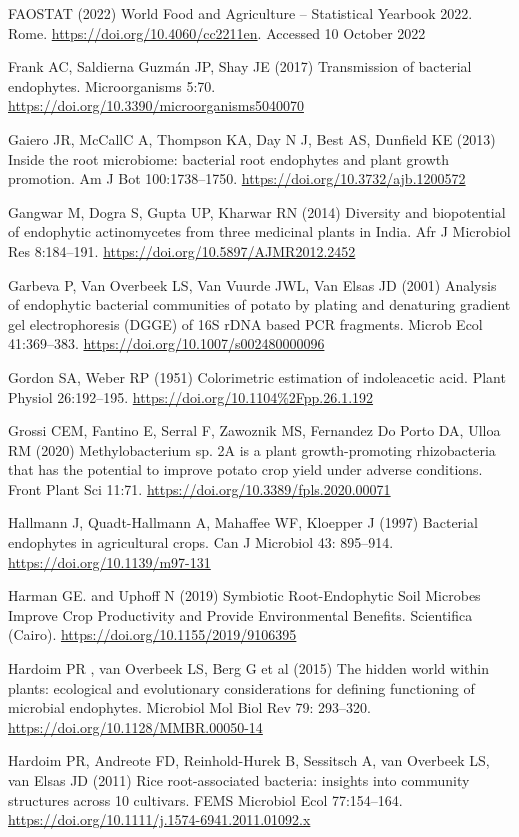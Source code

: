 \documentclass[sn-mathphys,Numbered]{sn-jnl}%
\theoremstyle{thmstyleone}%
\theoremstyle{thmstyletwo}%
\theoremstyle{thmstylethree}%
\begin{document}
FAOSTAT (2022) World Food and Agriculture – Statistical Yearbook 2022. Rome. \url{https://doi.org/10.4060/cc2211en}. Accessed 10 October 2022

Frank AC, Saldierna Guzmán JP, Shay JE (2017) Transmission of bacterial endophytes. Microorganisms 5:70. \url{https://doi.org/10.3390/microorganisms5040070}

Gaiero JR, McCallC A, Thompson KA, Day N J, Best AS, Dunfield KE (2013) Inside the root microbiome: bacterial root endophytes and plant growth promotion. Am J Bot 100:1738–1750. \url{https://doi.org/10.3732/ajb.1200572}

Gangwar M, Dogra S, Gupta UP, Kharwar RN (2014)   Diversity and biopotential of endophytic actinomycetes from three medicinal plants in India. Afr J Microbiol Res 8:184–191. \url{https://doi.org/10.5897/AJMR2012.2452}

Garbeva P, Van Overbeek LS, Van Vuurde JWL, Van Elsas JD (2001) Analysis of endophytic bacterial communities of potato by plating and denaturing gradient gel electrophoresis (DGGE) of 16S rDNA based PCR fragments. Microb Ecol 41:369–383. \url{https://doi.org/10.1007/s002480000096}

Gordon SA, Weber RP (1951) Colorimetric estimation of indoleacetic acid. Plant Physiol 26:192–195. \url{https://doi.org/10.1104%2Fpp.26.1.192}

Grossi CEM, Fantino E, Serral F, Zawoznik MS, Fernandez Do Porto DA, Ulloa RM (2020) Methylobacterium sp. 2A is a plant growth-promoting rhizobacteria that has the potential to improve potato crop yield under adverse conditions. Front Plant Sci 11:71. \url{https://doi.org/10.3389/fpls.2020.00071}

Hallmann J, Quadt-Hallmann  A, Mahaffee WF, Kloepper J (1997) Bacterial endophytes in agricultural crops. Can J Microbiol 43: 895–914. \url{https://doi.org/10.1139/m97-131}

Harman GE. and Uphoff N (2019) Symbiotic Root-Endophytic Soil Microbes Improve Crop Productivity and Provide Environmental Benefits.  Scientifica (Cairo).  \url{https://doi.org/10.1155/2019/9106395}

Hardoim PR , van Overbeek LS,  Berg G et al (2015) The hidden world within plants: ecological and evolutionary considerations for defining functioning of microbial endophytes. Microbiol Mol Biol Rev 79: 293–320. \url{https://doi.org/10.1128/MMBR.00050-14}

Hardoim PR, Andreote FD, Reinhold-Hurek B, Sessitsch A, van Overbeek LS, van Elsas JD (2011) Rice root-associated bacteria: insights into community structures across 10 cultivars. FEMS Microbiol Ecol 77:154–164. \url{https://doi.org/10.1111/j.1574-6941.2011.01092.x}
\end{document}
